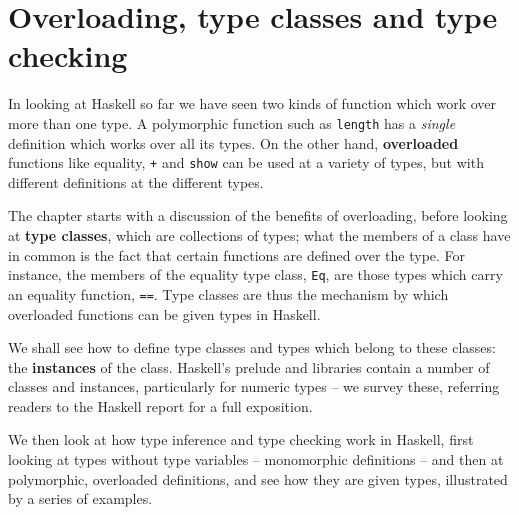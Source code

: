 
\chapter{Overloading, type classes and type checking}
\chapstart
\label{typeClasses}\label{types}
\label{classes}

In looking at Haskell so far we have seen two kinds of function which
work over more than one type.
A polymorphic function such as \texttt{length} has a \emph{single}
definition which works over all its types. On the other hand, 
\textbf{overloaded}
functions like equality, \texttt{+} and \texttt{show} can be used at a
variety of types, but with different definitions at the different
types. 

The chapter starts with a discussion of the benefits of overloading, before looking at 
\textbf{type classes}, which are collections of types; what the
members of a class have in common is the fact that certain functions are
defined over the type. For instance, the members of the equality type
class, \texttt{Eq}, are those types which carry an equality function,
\texttt{==}. Type classes are thus the mechanism by which overloaded
functions can be given types in Haskell.

We shall see how to define type classes and types which belong to these
classes: the \textbf{instances} of the class. 
Haskell's prelude and libraries contain a number of classes and
instances, particularly for numeric types -- we survey these, referring
readers to the Haskell report \cite{haskell2010} for a full exposition.


We then look at how type inference and type checking work in Haskell, first looking at types without type variables -- monomorphic definitions -- and then at polymorphic, overloaded definitions, and see how they are given types, illustrated by a series of examples.

\begin{webvideos}
\end{webvideos}

